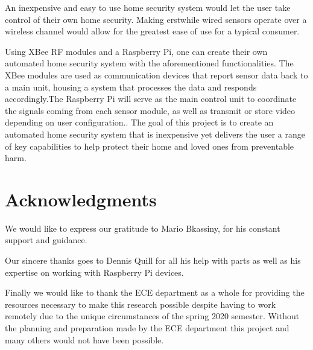\documentclass[a4paper,11pt]{report}
\begin{document}
	\par An inexpensive and easy to use home security system would let the user take control of their own home security. Making erstwhile wired sensors operate over a wireless channel would allow for the greatest ease of use for a typical consumer. 
	\par Using XBee RF modules and a Raspberry Pi, one can create their own automated home security system with the aforementioned functionalities. The XBee modules are used as communication devices that report sensor data back to a main unit, housing a system that processes the data and responds accordingly.The Raspberry Pi will serve as the main control unit to coordinate the signals coming from each sensor module, as well as transmit  or store video depending on user configuration.. The goal of this project is to create an automated home security system that is inexpensive yet delivers the user a range of  key capabilities to help protect their home and loved ones from preventable harm. 
	\section{Acknowledgments}
	\par We would like to express our gratitude to Mario Bkassiny, for his constant support and guidance.  \\
	\par Our sincere thanks goes to Dennis Quill for all his help with parts as well as his expertise on working with Raspberry Pi devices. \\
	\par Finally we would like to thank the ECE department as a whole for providing the resources necessary to make this research possible despite having to work remotely due to the unique circumstances of the spring 2020 semester. Without the planning and preparation made by the ECE department this project and many others would not have been possible. 
\end{document}
